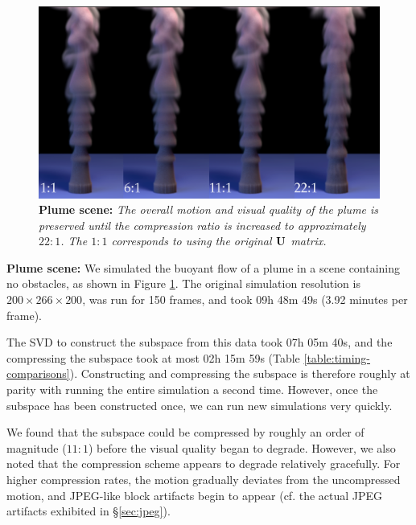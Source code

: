 \begin{figure}[t]
\includegraphics[width=\columnwidth]{chap4/figures/plumeComparison_brighter.png}
\caption{\textbf{Plume scene:} {\em The overall motion and visual quality of the plume is preserved until the compression ratio is increased to approximately $22:1$. The $1:1$ corresponds to using the original $\mathbf{U}$ matrix.}}
\label{fig:plumeComparison}
\end{figure}

\noindent \textbf{Plume scene:} We simulated the buoyant flow of a plume in a scene containing no obstacles, as shown in Figure \ref{fig:plumeComparison}. The original simulation resolution is $200 \times 266 \times 200$, was run for 150 frames, and took 09h 48m 49s (3.92 minutes per frame).

The SVD to construct the subspace from this data took 07h 05m 40s, and the compressing the subspace took at most 02h 15m 59s (Table \ref{table:timing-comparisons}). Constructing and compressing the subspace is therefore roughly at parity with running the entire simulation a second time. However, once the subspace has been constructed once, we can run new simulations very quickly.

We found that the subspace could be compressed by roughly an order of magnitude ($11:1$) before the visual quality began to degrade. However, we also noted that the compression scheme appears to degrade relatively gracefully. For higher compression rates, the motion gradually deviates from the uncompressed motion, and JPEG-like block artifacts begin to appear (cf. the actual JPEG artifacts exhibited in \S\ref{sec:jpeg}).

